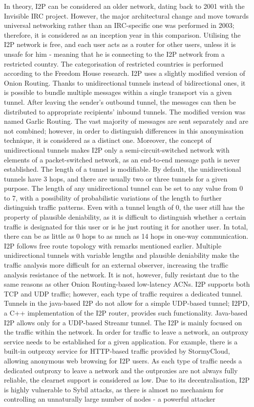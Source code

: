 In theory, I2P can be considered an older network, dating back to 2001 with the Invisible IRC project. However, the major architectural change and move towards universal networking rather than an IRC-specific one was performed in 2003; therefore, it is considered as an inception year in this comparison. Utilising the I2P network is free, and each user acts as a router for other users, unless it is unsafe for him - meaning that he is connecting to the I2P network from a restricted country. The categorisation of restricted countries is performed according to the Freedom House research. I2P uses a slightly modified version of Onion Routing. Thanks to unidirectional tunnels instead of bidirectional ones, it is possible to bundle multiple messages within a single transport via a given tunnel. After leaving the sender’s outbound tunnel, the messages can then be distributed to appropriate recipients’ inbound tunnels. The modified version was named Garlic Routing. The vast majority of messages are sent separately and are not combined; however, in order to distinguish differences in this anonymisation technique, it is considered as a distinct one. Moreover, the concept of unidirectional tunnels makes I2P only a semi-circuit-switched network with elements of a packet-switched network, as an end-to-end message path is never established. The length of a tunnel is modifiable. By default, the unidirectional tunnels have 3 hops, and there are usually two or three tunnels for a given purpose. The length of any unidirectional tunnel can be set to any value from 0 to 7, with a possibility of probabilistic variations of the length to further distinguish traffic patterns. Even with a tunnel length of 0, the user still has the property of plausible deniability, as it is difficult to distinguish whether a certain traffic is designated for this user or is he just routing it for another user. In total, there can be as little as 0 hops to as much as 14 hops in one-way communication. I2P follows free route topology with remarks mentioned earlier. Multiple unidirectional tunnels with variable lengths and plausible deniability make the traffic analysis more difficult for an external observer, increasing the traffic analysis resistance of the network. It is not, however, fully resistant due to the same reasons as other Onion Routing-based low-latency ACNs. I2P supports both TCP and UDP traffic; however, each type of traffic requires a dedicated tunnel. Tunnels in the java-based I2P do not allow for a simple UDP-based tunnel; I2PD, a C++ implementation of the I2P router, provides such functionality. Java-based I2P allows only for a UDP-based Streamr tunnel. The I2P is mainly focused on the traffic within the network. In order for traffic to leave a network, an outproxy service needs to be established for a given application. For example, there is a built-in outproxy service for HTTP-based traffic provided by StormyCloud, allowing anonymous web browsing for I2P users. As each type of traffic needs a dedicated outproxy to leave a network and the outproxies are not always fully reliable, the clearnet support is considered as low. Due to its decentralisation, I2P is highly vulnerable to Sybil attacks, as there is almost no mechanism for controlling an unnaturally large number of nodes - a powerful attacker 